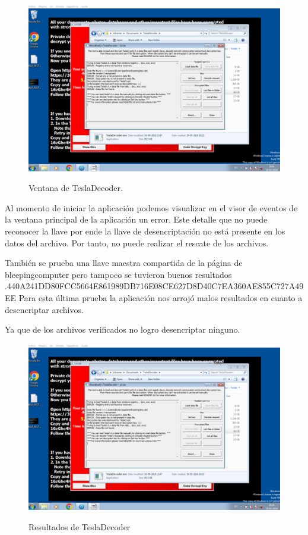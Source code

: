 \documentclass[stu, 11pt, letterpaper, donotrepeattitle, floatsintext, natbib]{apa7}
\begin{document}
\begin{figure}[H]
    \centering
    \caption{Ventana de TeslaDecoder.}
    \includegraphics[width=0.75\linewidth]{ram12.png} %
    \label{fig:OverallEffect}
\end{figure}

Al momento de iniciar la aplicación podemos visualizar en el visor de eventos de la ventana principal de la aplicación un error. Este detalle que no puede reconocer la llave por ende la llave de desencriptación no está presente en los datos del archivo. Por tanto, no puede realizar el rescate de los archivos.

También se prueba una llave maestra compartida de la página de bleepingcomputer pero tampoco se tuvieron buenos resultados .440A241DD80FCC5664E861989DB716E08CE627D8D40C7EA360AE855C727A49EE
Para esta última prueba la aplicación nos arrojó malos resultados en cuanto a desencriptar archivos.

Ya que de los archivos verificados no logro desencriptar ninguno. 

\begin{figure}[H]
    \centering
    \caption{Resultados de TeslaDecoder}
    \includegraphics[width=0.75\linewidth]{ram12.png} %
    \label{fig:OverallEffect}
\end{figure}
\end{document}
